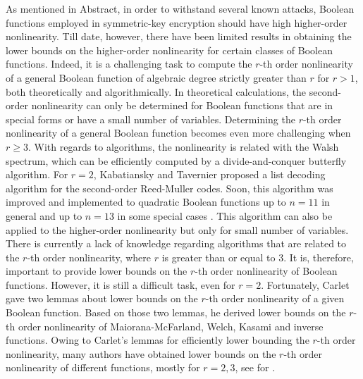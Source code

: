 \documentclass[preprint,10pt]{elsarticle}
\newcommand{\0}{\textbf{0}}
\newcommand{\1}{\textbf{1}}
\theoremstyle{plain}
\begin{document}
    As mentioned in Abstract, 
    in order to withstand several known attacks, Boolean functions employed in symmetric-key encryption should have high higher-order nonlinearity.
    Till date, however, 
    there have been limited results in obtaining the lower bounds on the higher-order nonlinearity for certain classes of Boolean functions. 
    Indeed, it is a challenging task to compute the $r$-th order nonlinearity of a general Boolean function of algebraic degree strictly greater than $r$ for $r>1$, both theoretically and algorithmically.
    In theoretical calculations, 
    the second-order nonlinearity can only be determined for Boolean functions that are in special forms or have a small number of variables.
    Determining the $r$-th order nonlinearity of a general Boolean function becomes even more challenging when $r\ge 3$.
    With regards to algorithms, the nonlinearity is related with the Walsh spectrum, which can be efficiently computed by a divide-and-conquer butterfly algorithm.
    For $r=2$, 
    Kabatiansky and Tavernier \cite{KabatianskyT2005listdecoding_RM_2_n} proposed a list decoding algorithm for the second-order Reed-Muller codes.
    Soon, this algorithm was improved and implemented to quadratic Boolean functions up to $n=11$ in general and up to $n=13$ in some special cases \cite{FourquetT2008improved_listdecoding_RM_2_n}.
    This algorithm can also be applied to the higher-order nonlinearity but only for small number of variables.
    There is currently a lack of knowledge regarding algorithms that are related to the $r$-th order nonlinearity, where $r$ is greater than or equal to $3$.
    It is, therefore, important to provide lower bounds on the $r$-th order nonlinearity of Boolean functions.
    However, it is still a difficult task, even for $r=2$.
    Fortunately, Carlet \cite{Carlet2008lowbound_NL_profile} gave two lemmas about lower bounds on the $r$-th order nonlinearity of a given Boolean function.
    Based on those two lemmas, he derived lower bounds on the $r$-th order nonlinearity of Maiorana-McFarland, Welch, Kasami and inverse functions.
    Owing to Carlet's lemmas for efficiently lower bounding the $r$-th order nonlinearity, many authors have obtained lower bounds on
    the $r$-th order nonlinearity of different functions, mostly for $r=2,3$, see for \cite{Carlet2011NL_Profile_Dillon,GangopadhyayST2010NL_2,GaoT2017NL_2_MM,GodeG2010NL_3Kasami,Liu2023NL_2,SihemKJ2020NL_2cubic,Singh2014NL_3_biquadratic,SunW2009NL_2,SunW2011NL_2,TangCT2013NL_2bent,TangYZZ2020NL_2bent,YanT2020NL_2}.
\end{document}
